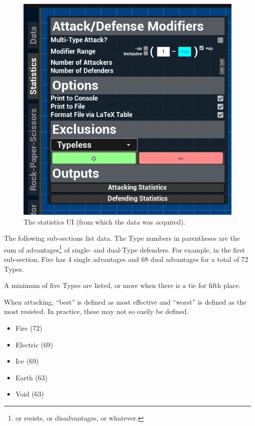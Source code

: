 \begin{figure}[H]
	\begin{center}
		\includegraphics[scale=2]{../Types-Documentation/statistics-ui}
		\caption{The statistics UI (from which the data was acquired).}
		\label{fig:stats-ui}
	\end{center}
\end{figure}

The following sub-sections list data. The Type numbers in parentheses are the sum of advantages\footnote{or resists, or disadvantages, or whatever.} of single- and dual-Type defenders. For example, in the first sub-section, Fire has 4 single advantages and 68 dual advantages for a total of 72 Types.

A minimum of five Types are listed, or more when there is a tie for fifth place.


When attacking, ``best'' is defined as most effective and ``worst'' is defined as the most resisted. In practice, these may not so easily be defined.




\begin{itemize}
	\item{Fire (72)}
	\item{Electric (69)}
	\item{Ice (69)}
	\item{Earth (63)}
	\item{Void (63)}
\end{itemize}

